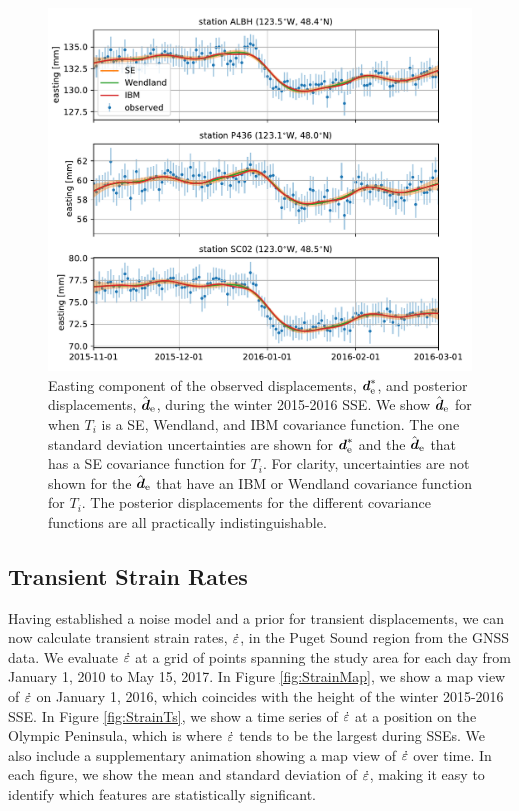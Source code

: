 \documentclass[extra,mreferee]{gji}
\begin{document}
\begin{figure}
\includegraphics{figures/signal_fit/signal-fit.pdf}
\caption{
Easting component of the observed displacements, $\data_\e^*$, and
posterior displacements, $\hat{\data}_\e$, during the winter 2015-2016
SSE. We show $\hat{\data}_\e$ for when $T_i$ is a SE, Wendland, and
IBM covariance function. The one standard deviation uncertainties are
shown for $\data_\e^*$ and the $\hat{\data}_\e$ that has a SE
covariance function for $T_i$. For clarity, uncertainties are not
shown for the $\hat{\data}_\e$ that have an IBM or Wendland covariance
function for $T_i$. The posterior displacements for the different
covariance functions are all practically indistinguishable.
}   
\label{fig:Fit}
\end{figure}

\subsection{Transient Strain Rates}\label{sec:Results} 


Having established a noise model and a prior for transient
displacements, we can now calculate transient strain rates, $\dot\varepsilon$,
in the Puget Sound region from the GNSS data. We evaluate $\dot\varepsilon$ at
a grid of points spanning the study area for each day from January 1,
2010 to May 15, 2017. In Figure \ref{fig:StrainMap}, we show a map
view of $\dot\varepsilon$ on January 1, 2016, which coincides with the height
of the winter 2015-2016 SSE. In Figure \ref{fig:StrainTs}, we show a
time series of $\dot\varepsilon$ at a position on the Olympic Peninsula, which
is where $\dot\varepsilon$ tends to be the largest during SSEs. We also
include a supplementary animation showing a map view of $\dot\varepsilon$ over
time. In each figure, we show the mean and standard deviation of
$\dot\varepsilon$, making it easy to identify which features are statistically
significant.
\end{document}
